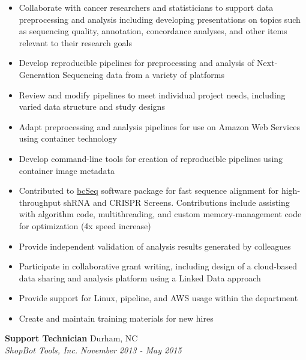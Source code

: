 \documentclass[10pt]{article}
\begin{document}
\begin{itemize}\raggedright
\setlength{\itemsep}{0pt}

\item Collaborate with cancer researchers and statisticians to support data preprocessing and analysis including developing presentations on topics such as sequencing quality, annotation, concordance analyses, and other items relevant to their research goals

\item Develop reproducible pipelines for preprocessing
  and analysis of Next-Generation Sequencing data
  from a variety of platforms

\item Review and modify pipelines to meet individual project needs, including varied data structure and study designs
  
\item Adapt preprocessing and analysis pipelines for use on
 Amazon Web Services using container technology

\item Develop command-line tools for creation of reproducible pipelines
  using container image metadata
  
\item Contributed to \href{https://github.com/jl354/bcSeq}{bcSeq} software
    package for fast sequence alignment for high-throughput shRNA and CRISPR Screens. Contributions include assisting with algorithm code, multithreading, and custom memory-management code for optimization (4x speed increase)

\item Provide independent validation of analysis results generated by colleagues

\item Participate in collaborative grant writing, including design of a cloud-based data sharing and analysis platform using a Linked Data approach
  
\item Provide support for Linux, pipeline, and AWS usage within the department
  
\item Create and maintain training materials for new hires
 
\end{itemize}
\break

\noindent
{\bf Support Technician} \hfill Durham, NC\\
{\it ShopBot Tools, Inc.} \hfill {\it November 2013 - May 2015}
\end{document}
